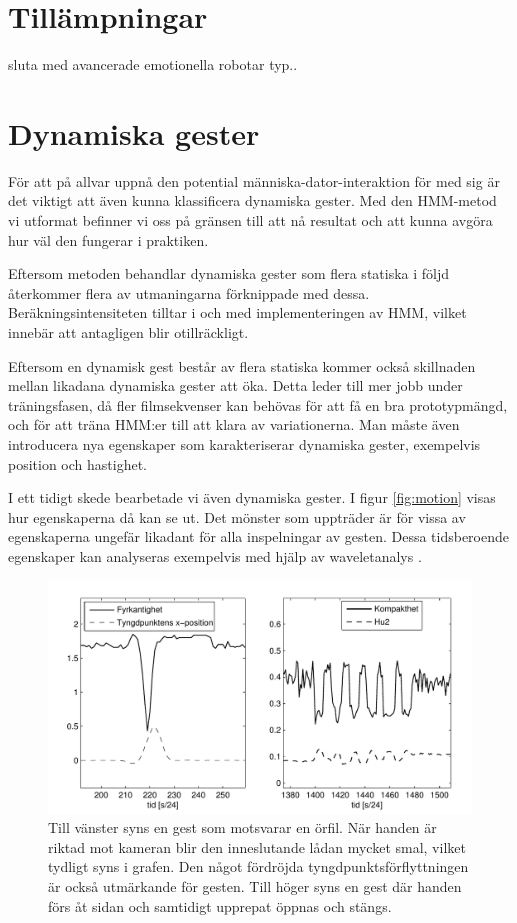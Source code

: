\documentclass[../rapport_MVEX01-11-05]{subfiles}
\begin{document}
\section{Tillämpningar}

sluta med avancerade emotionella robotar typ..

\section{Dynamiska gester}
För att på allvar uppnå den potential människa-dator-interaktion för med sig
är det viktigt att även kunna klassificera dynamiska gester.
Med den HMM-metod vi utformat befinner vi oss på gränsen till
att nå resultat och att kunna avgöra hur väl den fungerar i praktiken.

Eftersom metoden behandlar dynamiska gester som flera 
statiska i följd återkommer flera av utmaningarna förknippade med dessa. 
Beräkningsintensiteten tilltar i och med implementeringen av HMM, vilket innebär 
att \MATLAB antagligen blir otillräckligt.

Eftersom en dynamisk gest består av flera statiska
kommer också skillnaden mellan likadana dynamiska gester att öka. Detta leder till 
mer jobb under träningsfasen, då fler filmsekvenser kan behövas för att få en 
bra prototypmängd, och för att träna HMM:er till att klara av variationerna. 
Man måste även introducera nya egenskaper som karakteriserar dynamiska gester, 
exempelvis position och hastighet.

I ett tidigt skede bearbetade vi även dynamiska gester.
I figur \vref{fig:motion} visas hur egenskaperna då kan se ut.
Det mönster som uppträder är för vissa av egenskaperna
ungefär likadant för alla inspelningar av gesten.
Dessa tidsberoende egenskaper kan analyseras exempelvis
med hjälp av waveletanalys \cite{Hastie09}. 

\begin{figure}[tbp]
    \begin{center}
        \includegraphics[width=\columnwidth]{bilder/motion}
    \end{center}
    \caption{Till vänster syns en gest som motsvarar en örfil.
    När handen är riktad mot kameran blir den inneslutande
    lådan mycket smal, vilket tydligt syns i grafen.
    Den något fördröjda tyngdpunktsförflyttningen är också utmärkande för
    gesten. Till höger syns en gest där handen förs åt sidan och samtidigt
    upprepat öppnas och stängs.}
    \label{fig:motion}
\end{figure}
\end{document}
